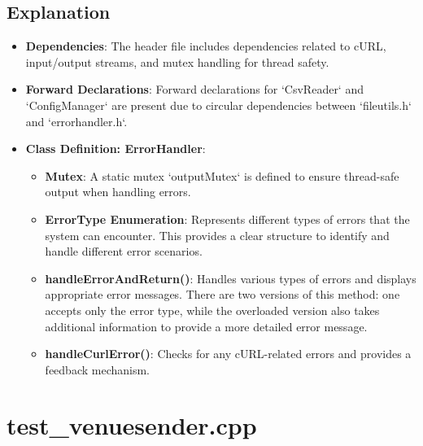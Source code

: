 \documentclass{article}
\begin{document}
	\subsection*{Explanation}
	\begin{itemize}
		\item \textbf{Dependencies}: The header file includes dependencies related to cURL, input/output streams, and mutex handling for thread safety.
		
		\item \textbf{Forward Declarations}: Forward declarations for `CsvReader` and `ConfigManager` are present due to circular dependencies between `fileutils.h` and `errorhandler.h`.
		
		\item \textbf{Class Definition: ErrorHandler}:
		\begin{itemize}
			\item \textbf{Mutex}: A static mutex `outputMutex` is defined to ensure thread-safe output when handling errors.
			
			\item \textbf{ErrorType Enumeration}: Represents different types of errors that the system can encounter. This provides a clear structure to identify and handle different error scenarios.
			
			\item \textbf{handleErrorAndReturn()}: Handles various types of errors and displays appropriate error messages. There are two versions of this method: one accepts only the error type, while the overloaded version also takes additional information to provide a more detailed error message.
			
			\item \textbf{handleCurlError()}: Checks for any cURL-related errors and provides a feedback mechanism.
		\end{itemize}
	\end{itemize}
	
	
	\section{test\_venuesender.cpp}
	
\end{document}
